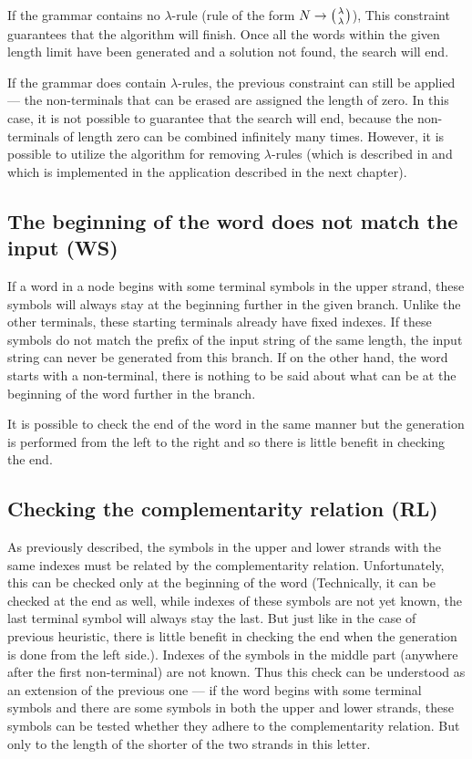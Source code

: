 If the grammar contains no $\lambda$-rule (rule of the form $N \rightarrow \wkpair{\lambda}{\lambda}$), This constraint guarantees that the algorithm will finish. Once all the words within the given length limit have been generated and a solution not found, the search will end.

If the grammar does contain $\lambda$-rules, the previous constraint can still be applied --- the non-terminals that can be erased are assigned the length of zero. In this case, it is not possible to guarantee that the search will end, because the non-terminals of length zero can be combined infinitely many times. However, it is possible to utilize the algorithm for removing $\lambda$-rules (which is described in \cite{WK_CYK} and which is implemented in the application described in the next chapter).

\subsection{The beginning of the word does not match the input (WS)}
If a word in a node begins with some terminal symbols in the upper strand, these symbols will always stay at the beginning further in the given branch. Unlike the other terminals, these starting terminals already have fixed indexes. If these symbols do not match the prefix of the input string of the same length, the input string can never be generated from this branch.
If on the other hand, the word starts with a non-terminal, there is nothing to be said about what can be at the beginning of the word further in the branch.

It is possible to check the end of the word in the same manner but the generation is performed from the left to the right and so there is little benefit in checking the end.

\subsection{Checking the complementarity relation (RL)}
As previously described, the symbols in the upper and lower strands with the same indexes must be related by the complementarity relation. Unfortunately, this can be checked only at the beginning of the word (Technically, it can be checked at the end as well, while indexes of these symbols are not yet known, the last terminal symbol will always stay the last. But just like in the case of previous heuristic, there is little benefit in checking the end when the generation is done from the left side.). Indexes of the symbols in the middle part (anywhere after the first non-terminal) are not known. Thus this check can be understood as an extension of the previous one --- if the word begins with some terminal symbols and there are some symbols in both the upper and lower strands, these symbols can be tested whether they adhere to the complementarity relation. But only to the length of the shorter of the two strands in this letter.

